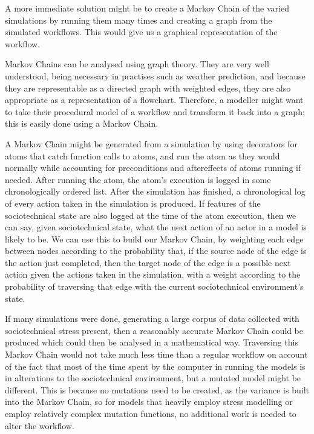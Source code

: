 A more immediate solution might be to create a Markov Chain of the varied simulations by running them many times and creating a graph from the simulated workflows. This would give us a graphical representation of the workflow. \par

Markov Chains can be analysed using graph theory. They are very well understood, being necessary in practises such as weather prediction\cite{4970864:online}, and because they are representable as a directed graph with weighted edges, they are also appropriate as a representation of a flowchart. Therefore, a modeller might want to take their procedural model of a workflow and transform it back into a graph; this is easily done using a Markov Chain. \par

A Markov Chain might be generated from a simulation by using decorators for atoms that catch function calls to atoms, and run the atom as they would normally while accounting for preconditions and aftereffects of atoms running if needed. After running the atom, the atom's execution is logged in some chronologically ordered list. After the simulation has finished, a chronological log of every action taken in the simulation is produced. If features of the sociotechnical state are also logged at the time of the atom execution, then we can say, given sociotechnical state, what the next action of an actor in a model is likely to be. We can use this to build our Markov Chain, by weighting each edge between nodes according to the probability that, if the source node of the edge is the action just completed, then the target node of the edge is a possible next action given the actions taken in the simulation, with a weight according to the probability of traversing that edge with the current sociotechnical environment's state. \par

If many simulations were done, generating a large corpus of data collected with sociotechnical stress present, then a reasonably accurate Markov Chain could be produced which could then be analysed in a mathematical way. Traversing this Markov Chain would not take much less time than a regular workflow on account of the fact that most of the time spent by the computer in running the models is in alterations to the sociotechnical environment, but a mutated model might be different. This is because no mutations need to be created, as the variance is built into the Markov Chain, so for models that heavily employ stress modelling or employ relatively complex mutation functions, no additional work is needed to alter the workflow. \par
